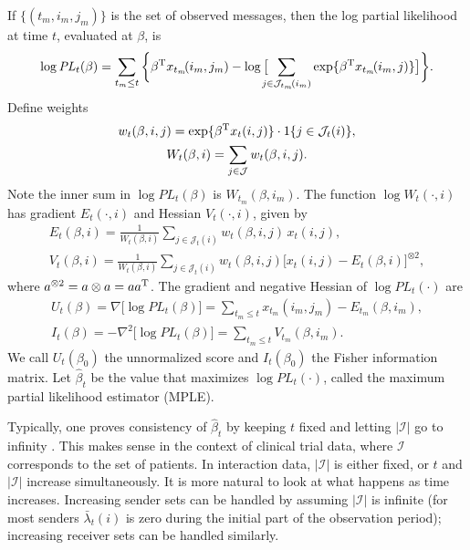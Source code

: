 \documentclass[aoas,preprint]{imsart}
\begin{document}
  
If $\{ (t_m, i_m, j_m) \}$ is the set of observed messages, then
the log partial likelihood at time $t$, evaluated at $\beta$, is
\begin{equation}\label{E:log-pl}
    \log
    \mathit{PL}_t(\beta)
        =
        \sum_{t_m \leq t}
        \bigg\{
            \beta^\trans x_{t_m}\!(i_m, j_m)
            -
            \log\big[
                \!\!\!\!
                \sum_{j \in \mathcal{J}_{t_m}\!(i_m)}
                    \exp\{ \beta^\trans x_{t_m}\!(i_m, j)\}
            \big]
        \bigg\}.
\end{equation}
Define weights
\begin{gather}
    w_{t}(\beta, i,j)
        =
        \exp\{ \beta^\trans x_t(i,j) \}
        \cdot
        1\{ j \in \mathcal{J}_t(i)\}, \\
    W_{t}(\beta, i)
        =
        \sum_{j \in \mathcal{J}} w_{t}(\beta, i,j).
\end{gather}
Note the inner sum in $\log \mathit{PL}_t(\beta)$ is
$W_{t_m}\!(\beta, i_m)$.  The function 
$\log W_{t}(\cdot, i)$ has gradient $E_{t}(\cdot, i)$ and Hessian 
$V_{t}(\cdot, i)$, given by
\begin{gather}
    E_{t}(\beta, i)
        =
        \frac{1}{W_{t}(\beta, i)}
        \sum_{j \in \mathcal{J}_t(i)}
            w_{t}(\beta, i,j) \, x_{t}(i,j), \\
    V_{t}(\beta, i)
        =
        \frac{1}{W_{t}(\beta, i)}
        \sum_{j \in \mathcal{J}_t(i)}
            w_{t}(\beta, i,j) 
            \Big[ x_{t}(i,j) - E_{t}(\beta, i)\Big]^{\otimes 2},
\end{gather}
where $a^{\otimes 2} = a \otimes a = a a^{\mathrm{T}}$.
The gradient and negative Hessian of $\log \mathit{PL}_t(\cdot)$ are
\begin{gather}
    \label{E:log-pl-gradient}
    U_t(\beta)
        =
        \nabla \big[ \log \mathit{PL}_t(\beta) \big]
        =
        \sum_{t_m \leq t}
            x_{t_m}(i_m, j_m) - E_{t_m}(\beta, i_m), \\
    \label{E:log-pl-neg-hessian}            
    I_t(\beta)
        =
        -\nabla^2 \big[ \log \mathit{PL}_t(\beta) \big]
        =
        \sum_{t_m \leq t}
            V_{t_m}(\beta, i_m).
\end{gather}
We call $U_t(\beta_0)$ the unnormalized score and $I_t(\beta_0)$
the Fisher information matrix.  Let $\hat \beta_t$ be the value that
maximizes $\log \mathit{PL}_t(\cdot)$, called the maximum partial
likelihood estimator (MPLE). 

Typically, one proves consistency of $\hat \beta_t$ by keeping $t$ fixed
and letting $|\mathcal{I}|$ go to infinity
\cite{andersen1993statistical,andersen1982cox,cook2007statistical,fleming1991counting,
martinussen2006dynamic}.  This makes sense in the context of clinical trial
data, where $\mathcal{I}$ corresponds to the set of patients.  In interaction
data, $|\mathcal{I}|$ is either fixed, or $t$ and $|\mathcal{I}|$ increase
simultaneously.  It is more natural to look at what happens as time increases.
Increasing sender sets can be handled by assuming $|\mathcal{I}|$ is infinite
(for most senders $\bar \lambda_t(i)$ is zero during the initial
part of the observation period); increasing receiver sets can be
handled similarly.
\end{document}
